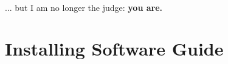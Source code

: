 \documentclass[11pt]{article}
\begin{document}
	\paragraph{} ... but I am no longer the judge: \textbf{you are.}

	\paragraph{} \paragraph{}\paragraph{} \paragraph{}

	\begin{center}
		\graphicspath{ {.} }
		\centering
	\end{center}

	\paragraph{} \paragraph{} \paragraph{} \paragraph{}

	\hrulefill

	\newpage

	\section{Installing Software Guide}
\end{document}
